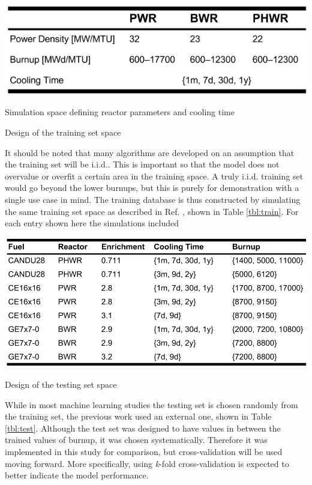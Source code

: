 \begin{table}[!hp]
  \begin{subtable}{\linewidth}
    \centering
    \includegraphics[width=0.7\linewidth]{./chapters/demo_method/TrainData2.png}
    \caption{Simulation space defining reactor parameters and cooling time}
    \label{tbl:rxtrparam}
  \end{subtable}%
  \caption{Design of the training set space}
  \label{tbl:train}
\end{table}

It should be noted that many algorithms are developed on an assumption that the
training set will be \gls{i.i.d.}. This is important so that the model does not
overvalue or overfit a certain area in the training space.  A truly
\gls{i.i.d.} training set would go beyond the lower burnups, but this is purely
for demonstration with a single use case in mind.  The training database is
thus constructed by simulating the same training set space as described in Ref.
\cite{dayman_feasibility_2013}, shown in Table \ref{tbl:train}. For each entry 
shown here the simulations included 

\begin{table}[!hp]
  \centering
  \includegraphics[width=0.95\linewidth]{./chapters/demo_method/TestData.png}
  \caption{Design of the testing set space}
  \label{tbl:test}
\end{table}

While in most machine learning studies the testing set is chosen randomly from
the training set, the previous work used an external one, shown in Table
\ref{tbl:test}.  Although the test set was designed to have values in between
the trained values of burnup, it was chosen systematically. Therefore it was
implemented in this study for comparison, but cross-validation will be used
moving forward. More specifically, using \textit{k}-fold cross-validation is
expected to better indicate the model performance. 

